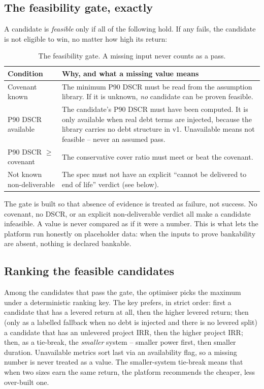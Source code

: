 \subsection{The feasibility gate, exactly}

A candidate is \emph{feasible} only if all of the following hold. If any fails, the candidate is not eligible to win, no matter how high its return:

\begin{table}[H]
\centering
\caption{The feasibility gate. A missing input never counts as a pass.}
\label{tab:gate}
\small\sffamily
\begin{tabularx}{\textwidth}{@{}l L@{}}
\toprule
\textbf{Condition} & \textbf{Why, and what a missing value means} \\
\midrule
Covenant known & The minimum P90 DSCR must be read from the assumption library. If it is unknown, \emph{no} candidate can be proven feasible. \\
P90 DSCR available & The candidate's P90 DSCR must have been computed. It is only available when real debt terms are injected, because the library carries no debt structure in v1. Unavailable means not feasible -- never an assumed pass. \\
P90 DSCR $\ge$ covenant & The conservative cover ratio must meet or beat the covenant. \\
Not known non-deliverable & The spec must not have an explicit ``cannot be delivered to end of life'' verdict (see below). \\
\bottomrule
\end{tabularx}
\end{table}

\begin{caution}
The gate is built so that absence of evidence is treated as failure, not success. No covenant, no DSCR, or an explicit non-deliverable verdict all make a candidate infeasible. A  value is never compared as if it were a number. This is what lets the platform run honestly on placeholder data: when the inputs to prove bankability are absent, nothing is declared bankable.
\end{caution}

\subsection{Ranking the feasible candidates}

Among the candidates that pass the gate, the optimiser picks the maximum under a deterministic ranking key. The key prefers, in strict order: first a candidate that has a levered return at all, then the higher levered return; then (only as a labelled fallback when no debt is injected and there is no levered split) a candidate that has an unlevered project IRR, then the higher project IRR; then, as a tie-break, the \emph{smaller} system -- smaller power first, then smaller duration. Unavailable metrics sort last via an availability flag, so a missing number is never treated as a value. The smaller-system tie-break means that when two sizes earn the same return, the platform recommends the cheaper, less over-built one.

